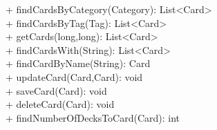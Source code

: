 { 
    + findCardsByCategory(Category): List<Card>\\
    + findCardsByTag(Tag): List<Card>\\
    + getCards(long,long): List<Card>\\
    + findCardsWith(String): List<Card>\\
    + findCardByName(String): Card\\
    + updateCard(Card,Card): void\\
    + saveCard(Card): void\\
    + deleteCard(Card): void\\
    + findNumberOfDecksToCard(Card): int\\
}{}